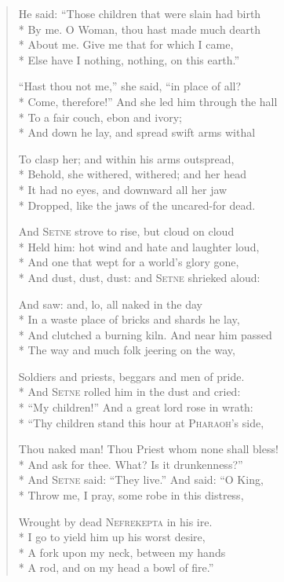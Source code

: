 \documentclass[12pt]{article}
\newcommand{\vin}{\hspace{1em}}
\begin{document}
\begin{verse}
He said: ``Those children that were slain had birth\\*
By me. O Woman, thou hast made much dearth\\*
\vin About me. Give me that for which I came,\\*
Else have I nothing, nothing, on this earth.''

``Hast thou not me,'' she said, ``in place of all?\\*
Come, therefore!'' And she led him through the hall\\*
\vin To a fair couch, ebon and ivory;\\*
And down he lay, and spread swift arms withal

To clasp her; and within his arms outspread,\\*
Behold, she withered, withered; and her head\\*
\vin It had no eyes, and downward all her jaw\\*
Dropped, like the jaws of the uncared-for dead.

And \textsc{Setne} strove to rise, but cloud on cloud\\*
Held him: hot wind and hate and laughter loud,\\*
\vin And one that wept for a world's glory gone,\\*
And dust, dust, dust: and \textsc{Setne} shrieked aloud:

And saw: and, lo, all naked in the day\\*
In a waste place of bricks and shards he lay,\\*
\vin And clutched a burning kiln. And near him passed\\*
The way and much folk jeering on the way,

Soldiers and priests, beggars and men of pride.\\*
And \textsc{Setne} rolled him in the dust and cried:\\*
\vin ``My children!'' And a great lord rose in wrath:\\*
``Thy children stand this hour at \textsc{Pharaoh}'s side,

Thou naked man! Thou Priest whom none shall bless!\\*
And ask for thee. What? Is it drunkenness?''\\*
\vin And \textsc{Setne} said: ``They live.'' And said: ``O King,\\*
Throw me, I pray, some robe in this distress,

Wrought by dead \textsc{Nefrekepta} in his ire.\\*
I go to yield him up his worst desire,\\*
\vin A fork upon my neck, between my hands\\*
A rod, and on my head a bowl of fire.''


\end{verse}
\end{document}
